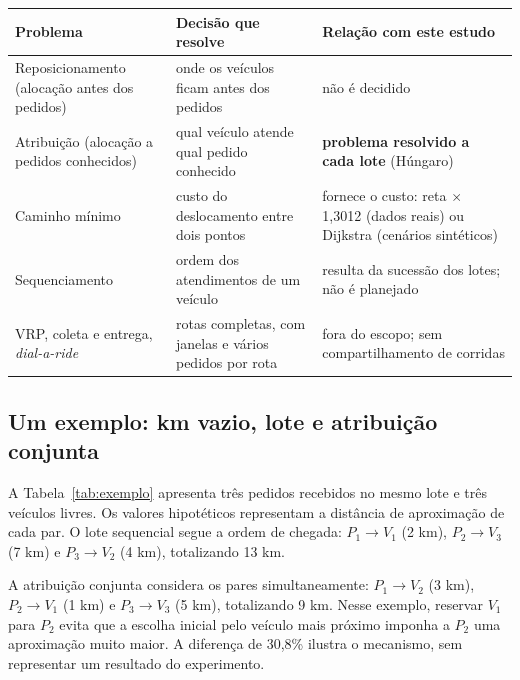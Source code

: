 \begin{quadro}[!htb]
\caption{Relação entre problemas clássicos e a decisão estudada}\label{qua:problemas}
\centering\fontetabela
\begin{tabular}{|>{\raggedright\arraybackslash}p{30mm}|>{\raggedright\arraybackslash}p{58mm}|>{\raggedright\arraybackslash}p{60mm}|}
\hline
\textbf{Problema} & \textbf{Decisão que resolve} & \textbf{Relação com este estudo} \\
\hline
Reposicionamento (alocação antes dos pedidos) & onde os veículos ficam antes dos pedidos & não é decidido \\
\hline
Atribuição (alocação a pedidos conhecidos) & qual veículo atende qual pedido conhecido & \textbf{problema resolvido a cada lote} (Húngaro) \\
\hline
Caminho mínimo & custo do deslocamento entre dois pontos & fornece o custo: reta $\times$ 1,3012 (dados reais) ou Dijkstra (cenários sintéticos) \\
\hline
Sequenciamento & ordem dos atendimentos de um veículo & resulta da sucessão dos lotes; não é planejado \\
\hline
VRP, coleta e entrega, \textit{dial-a-ride} & rotas completas, com janelas e vários pedidos por rota & fora do escopo; sem compartilhamento de corridas \\
\hline
\end{tabular}
\end{quadro}

\subsection{Um exemplo: km vazio, lote e atribuição conjunta}

A Tabela~\ref{tab:exemplo} apresenta três pedidos recebidos no mesmo lote e três veículos livres. Os valores hipotéticos representam a distância de aproximação de cada par. O lote sequencial segue a ordem de chegada: $P_1\to V_1$ (2 km), $P_2\to V_3$ (7 km) e $P_3\to V_2$ (4 km), totalizando 13 km.

A atribuição conjunta considera os pares simultaneamente: $P_1\to V_2$ (3 km), $P_2\to V_1$ (1 km) e $P_3\to V_3$ (5 km), totalizando 9 km. Nesse exemplo, reservar $V_1$ para $P_2$ evita que a escolha inicial pelo veículo mais próximo imponha a $P_2$ uma aproximação muito maior. A diferença de 30,8\% ilustra o mecanismo, sem representar um resultado do experimento.

